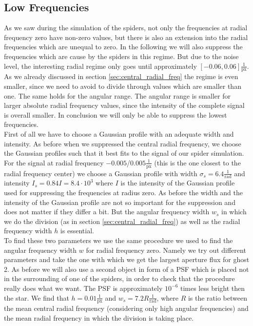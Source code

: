 \subsection{Low Frequencies}
As we saw during the simulation of the spiders, not only the frequencies at radial frequency zero have non-zero values, but there is also an extension into the radial frequencies which are unequal to zero. In the following we will also suppress the frequencies which are cause by the spiders in this regime. But due to the noise level, the interesting radial regime only goes until approximately $[-0.06, 0.06] \frac{1}{\mathrm{px}}$. As we already discussed in section \ref{sec:central_radial_freq} the regime is even smaller, since we need to avoid to divide through values which are smaller than one. The same holds for the angular range. The angular range is smaller for larger absolute radial frequency values, since the intensity of the complete signal is overall smaller. In conclusion we will only be able to suppress the lowest frequencies.\\
First of all we have to choose a Gaussian profile with an adequate width and intensity. As before when we suppressed the central radial frequency, we choose the Gaussian profiles such that it best fits to the signal of our spider simulation. For the signal at radial frequency $-0.005$/$0.005 \frac{1}{\mathrm{px}}$ (this is the one closest to the radial frequency center) we choose a Gaussian profile with width $\sigma_s = 6.4 \frac{1}{\mathrm{rad}}$ and intensity $I_s = 0.84 I = 8.4 \cdot 10^3$ where $I$ is the intensity of the Gaussian profile used for suppressing the frequencies at radius zero. As before the width and the intensity of the Gaussian profile are not so important for the suppression and does not matter if they differ a bit. But the angular frequency width $w_s$ in which we do the division (as in section \ref{sec:central_radial_freq}) as well as the radial frequency width $h$ is essential.\\
To find these two parameters we use the same procedure we used to find the angular frequency width $w$ for radial frequency zero. Namely we try out different parameters and take the one with which we get the largest aperture flux for ghost 2. As before we will also use a second object in form of a PSF which is placed not in the surrounding of one of the spiders, in order to check that the procedure really does what we want. The PSF is approximately $10^{-6}$ times less bright then the star. We find that $h = 0.01 \frac{1}{\mathrm{px}}$ and $w_s = 7.2 R \frac{1}{\mathrm{rad}}$, where $R$ is the ratio between the mean central radial frequency (considering only high angular frequencies) and the mean radial frequency in which the division is taking place.\\
